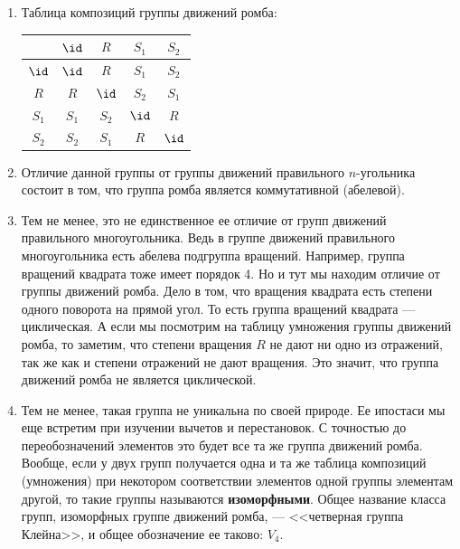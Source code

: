 \begin{enumerate}
\item Таблица композиций группы движений ромба:
\begin{center}
\begin{tabular}{c||c|c|c|c|}
      & $\id$     & $R$   & $S_1$ & $S_2$ \\ \hline\hline
$\id$ & $\id$     & $R$   & $S_1$ & $S_2$ \\ \hline
$R$   & $R$       & $\id$ & $S_2$ & $S_1$ \\ \hline
$S_1$ & $S_1$     & $S_2$ & $\id$ & $R$ \\ \hline
$S_2$ & $S_2$     & $S_1$ & $R$   & $\id$ \\ \hline
\end{tabular}
\end{center}
\item Отличие данной группы от группы движений правильного $n$-угольника состоит в том, что группа ромба является коммутативной (абелевой).
\item Тем не менее, это не единственное ее отличие от групп движений правильного многоугольника.
Ведь в группе движений правильного многоугольника есть абелева подгруппа вращений. Например, группа вращений квадрата тоже имеет порядок 4. Но и тут мы находим отличие от группы движений ромба. Дело в том, что вращения квадрата есть степени одного поворота на прямой угол. То есть группа вращений квадрата --- циклическая. А если мы посмотрим на таблицу умножения группы движений ромба, то заметим, что степени вращения $R$ не дают ни одно из отражений, так же как и степени отражений не дают вращения. Это значит, что группа движений ромба не является циклической.
\item Тем не менее, такая группа не уникальна по своей природе. Ее ипостаси мы еще встретим при изучении вычетов и перестановок. С точностью до переобозначений элементов это будет все та же группа движений ромба. Вообще, если у двух групп получается одна и та же таблица композиций (умножения) при некотором соответствии элементов одной группы элементам другой, то такие группы называются \textbf{изоморфными}. Общее название класса групп, изоморфных группе движений ромба, --- <<четверная группа Клейна>>, и общее обозначение ее таково: $V_4$.
\end{enumerate}

\label{LinearEqs}

